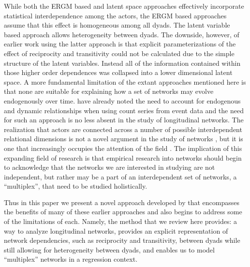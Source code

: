 \documentclass[3p,times,twocolumn,authoryear,12pt]{elsarticle}
\def\checkmark{\tikz\fill[scale=0.4](0,.35) -- (.25,0) -- (1,.7) -- (.25,.15) -- cycle;}
\begin{document}
While both the ERGM based and latent space approaches effectively incorporate statistical interdependence among the actors, the ERGM based approaches assume that this effect is homogeneous among all dyads. The latent variable based approach allows heterogeneity between dyads. The downside, however, of earlier work using the latter approach is that explicit parameterizations of the effect of reciprocity and transitivity could not be calculated due to the simple structure of the latent variables. Instead all of the information contained within those higher order dependences was collapsed into a lower dimensional latent space. A more fundamental limitation of the extant approaches mentioned here is that none are suitable for explaining how a set of networks may evolve endogenously over time. \citet{brandt:sandler:2012} have already noted the need to account for endogenous and dynamic relationships when using count series from event data and the need for such an approach is no less absent in the study of longitudinal networks. The realization that actors are connected across a number of possible interdependent relational dimensions is not a novel argument in the study of networks \citep{wasserman:faust:1994}, but it is one that increasingly occupies the attention of the field \citep{de:etal:2013, kivela:etal:2014, boccaletti:etal:2014, d:scala:2014}. The implication of this expanding field of research is that empirical research into networks should begin to acknowledge that the networks we are interested in studying are not independent, but rather may be a part of an interdependent set of networks, a ``multiplex'', that need to be studied holistically. 

Thus in this paper we present a novel approach developed by \citet{hoff:2015} that encompasses the benefits of many of these earlier approaches and also begins to address some of the limitations of each. Namely, the method that we review here provides: a way to analyze longitudinal networks, provides an explicit representation of network dependencies, such as reciprocity and transitivity, between dyads while still allowing for heterogeneity between dyads, and enables us to model ``multiplex'' networks in a regression context. 

\end{document}
